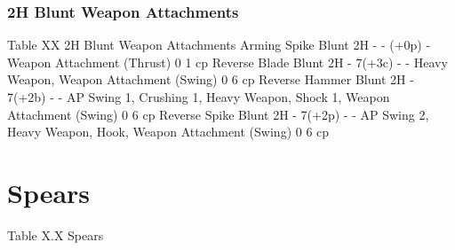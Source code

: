 \documentclass[oneside,11pt,english]{book}
\begin{document}
\subsubsection{2H Blunt Weapon Attachments} %
Table XX 2H Blunt Weapon Attachments
Arming Spike Blunt 2H - - (+0p) - Weapon Attachment (Thrust) 0 1 cp
Reverse Blade Blunt 2H - 7(+3c) - - Heavy Weapon, Weapon Attachment (Swing) 0 6 cp
Reverse Hammer Blunt 2H - 7(+2b) - - AP Swing 1, Crushing 1, Heavy Weapon, Shock 1, Weapon Attachment (Swing) 0 6 cp
Reverse Spike Blunt 2H - 7(+2p) - - AP Swing 2, Heavy Weapon, Hook, Weapon Attachment (Swing) 0 6 cp

\section{Spears}
Table X.X Spears
\end{document}
